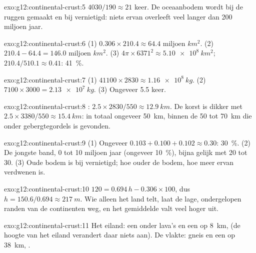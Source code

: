 \begin{solution}{exo:g12:continental-crust:5}
$4030/190 \approx 21$ keer. De oceaanbodem wordt bij de ruggen gemaakt en
bij  vernietigd: niets ervan overleeft veel langer dan 200 miljoen
jaar.
\end{solution}

\begin{solution}{exo:g12:continental-crust:6}
(1) $0.306 \times 210.4 \approx \num{64.4}\text{ miljoen }\unit{km^2}$.
(2) $210.4 - 64.4 = \num{146.0}\text{ miljoen }\unit{km^2}$.
(3) $4\pi \times 6371^2 \approx \qty{5.10e8}{km^2}$; $210.4/510.1 \approx
0.41$: \qty{41}{\percent}.
\end{solution}

\begin{solution}{exo:g12:continental-crust:7}
(1) $41100 \times 2830 \approx \qty{1.16e8}{kg}$. (2) $7100 \times 3000 =
\qty{2.13e7}{kg}$. (3) Ongeveer 5.5 keer.
\end{solution}

\begin{solution}{exo:g12:continental-crust:8}
: $2.5 \times 2830/550 \approx \qty{12.9}{km}$. De korst is dikker met
$2.5 \times 3380/550 \approx \qty{15.4}{km}$: in totaal ongeveer \qty{50}{km},
binnen de 50 tot \qty{70}{km} die onder gebergtegordels is gevonden.
\end{solution}

\begin{solution}{exo:g12:continental-crust:9}
(1) Ongeveer $0.103 + 0.100 + 0.102 \approx 0.30$: \qty{30}{\percent}.
(2) De jongste band, 0 tot 10 miljoen jaar (ongeveer \qty{10}{\percent}),
bijna gelijk met 20 tot 30. (3) Oude bodem is bij  vernietigd;
hoe ouder de bodem, hoe meer ervan verdwenen is.
\end{solution}

\begin{solution}{exo:g12:continental-crust:10}
$120 = 0.694\,h - 0.306 \times 100$, dus $h = 150.6/0.694 \approx
\qty{217}{m}$. Wie alleen het land telt, laat de lage, ondergelopen randen van
de continenten weg, en het gemiddelde valt veel hoger uit.
\end{solution}

\begin{solution}{exo:g12:continental-crust:11}
Het eiland: een  onder lava's en een  op \qty{8}{km}, 
(de hoogte van het eiland verandert daar niets aan). De vlakte: gneis en een
 op \qty{38}{km}, .
\end{solution}

